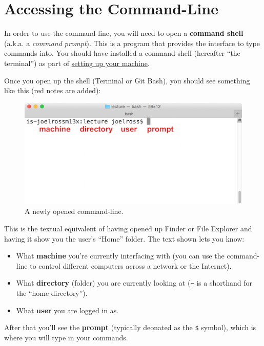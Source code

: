 \documentclass[]{book}
\providecommand{\tightlist}{%
  \setlength{\itemsep}{0pt}\setlength{\parskip}{0pt}}
\theoremstyle{definition}
\theoremstyle{definition}
\theoremstyle{remark}
\begin{document}
\section{Accessing the Command-Line}\label{accessing-the-command-line}

In order to use the command-line, you will need to open a
\textbf{command shell} (a.k.a. a \emph{command prompt}). This is a
program that provides the interface to type commands into. You should
have installed a command shell (hereafter ``the terminal'') as part of
\protect\hyperlink{setup-machine}{setting up your machine}.

Once you open up the shell (Terminal or Git Bash), you should see
something like this (red notes are added):

\begin{figure}
\centering
\includegraphics{img/command-line/cli-blank.png}
\caption{A newly opened command-line.}
\end{figure}

This is the textual equivalent of having opened up Finder or File
Explorer and having it show you the user's ``Home'' folder. The text
shown lets you know:

\begin{itemize}
\tightlist
\item
  What \textbf{machine} you're currently interfacing with (you can use
  the command-line to control different computers across a network or
  the Internet).
\item
  What \textbf{directory} (folder) you are currently looking at
  (\texttt{\textasciitilde{}} is a shorthand for the ``home
  directory'').
\item
  What \textbf{user} you are logged in as.
\end{itemize}

After that you'll see the \textbf{prompt} (typically deonated as the
\texttt{\$} symbol), which is where you will type in your commands.
\end{document}
